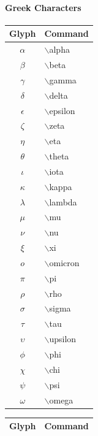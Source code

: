 \newpage

\paragraph{Greek Characters}

\begin{center}
  \begin{tabular}{|c|l|} \hline
    \textbf{Glyph} & \textbf{Command}\\ \hline
    $\alpha$ & $\backslash$alpha\\ \hline
    $\beta$ & $\backslash$beta\\ \hline
    $\gamma$ & $\backslash$gamma\\ \hline
    $\delta$ & $\backslash$delta\\ \hline
    $\epsilon$ & $\backslash$epsilon\\ \hline
    $\zeta$ & $\backslash$zeta\\ \hline
    $\eta$ & $\backslash$eta\\ \hline
    $\theta$ & $\backslash$theta\\ \hline
    $\iota$ & $\backslash$iota\\ \hline
    $\kappa$ & $\backslash$kappa\\ \hline
    $\lambda$ & $\backslash$lambda\\ \hline
    $\mu$ & $\backslash$mu\\ \hline
    $\nu$ & $\backslash$nu\\ \hline
    $\xi$ & $\backslash$xi\\ \hline
    $o$ & $\backslash$omicron\\ \hline
    $\pi$ & $\backslash$pi\\ \hline
    $\rho$ & $\backslash$rho\\ \hline
    $\sigma$ & $\backslash$sigma\\ \hline
    $\tau$ & $\backslash$tau\\ \hline
    $\upsilon$ & $\backslash$upsilon\\ \hline
    $\phi$ & $\backslash$phi\\ \hline
    $\chi$ & $\backslash$chi\\ \hline
    $\psi$ & $\backslash$psi\\ \hline
    $\omega$ & $\backslash$omega\\ \hline
  \end{tabular}
  \begin{tabular}{|c|l|} \hline
    \textbf{Glyph} & \textbf{Command}\\ \hline

\end{tabular}
\end{center}

